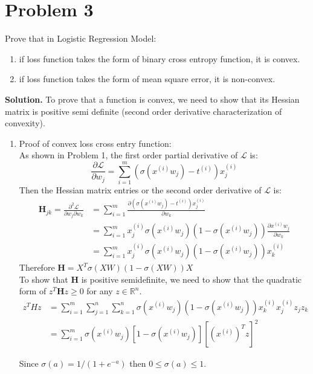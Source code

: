 \documentclass[a4paper, 12pt]{article}  %
\begin{document}
\section{Problem 3} Prove that in Logistic Regression Model:
\begin{enumerate}
    \item if loss function takes the form of binary cross entropy function, it is convex.
    \item if loss function takes the form of mean square error, it is non-convex.
\end{enumerate}
\textbf{Solution.} To prove that a function is convex, we need to show that its Hessian matrix is positive semi definite (second order derivative characterization of convexity).
\begin{enumerate}
    \item Proof of convex loss cross entry function:\\
    As shown in Problem 1, the first order partial derivative of $\mathcal{L}$ is:
    \[\frac{\partial \mathcal{L}}{\partial w_j} = \sum^m_{i=1} (\sigma(x^{(i)} w_j) - t^{(i)})x^{(i)}_j\]
    Then the Hessian matrix entries or the second order derivative of $\mathcal{L}$ is:
    \begin{align*}
        \mathbf{H}_{jk} = \frac{\partial^2 \mathcal{L}}{\partial w_j \partial w_k} &= \sum^m_{i=1} \frac{\partial (\sigma(x^{(i)} w_j) - t^{(i)})x^{(i)}_j}{\partial w_k}\\
        &= \sum^m_{i=1} x_j^{(i)} \sigma(x^{(i)} w_j) (1 - \sigma(x^{(i)} w_j)) \frac{\partial x^{(i)} w_j}{\partial w_k} \\
        &= \sum^m_{i=1} x_j^{(i)} \sigma(x^{(i)} w_j) (1 - \sigma(x^{(i)} w_j)) x_k^{(i)}
    \end{align*}
    Therefore \(\mathbf{H} = X^T \sigma(XW) (1 - \sigma(XW)) X\) \\
    To show that $\mathbf{H}$ is positive semidefinite, we need to show that the quadratic form of $z^T\mathbf{H}z \geq 0$ for any $z \in \mathbb{R}^n$.
    \begin{align*}
    z^T H z & = \sum_{i=1}^m \sum_{j=1}^n \sum_{k=1}^n \sigma(x^{(i)} w_j)(1 - \sigma(x^{(i)} w_j)) x^{(i)}_k x^{(i)}_j z_j  z_k\\
    & = \sum_{i=1}^m \sigma(x^{(i)} w_j)[1 - \sigma(x^{(i)} w_j)][(x^{(i)})^T z]^2
    \end{align*}

    Since \(\sigma(a) = 1/(1+e^{-a})\) then \(0 \leq \sigma(a) \leq 1 \). 
    

\end{enumerate}
\end{document}
